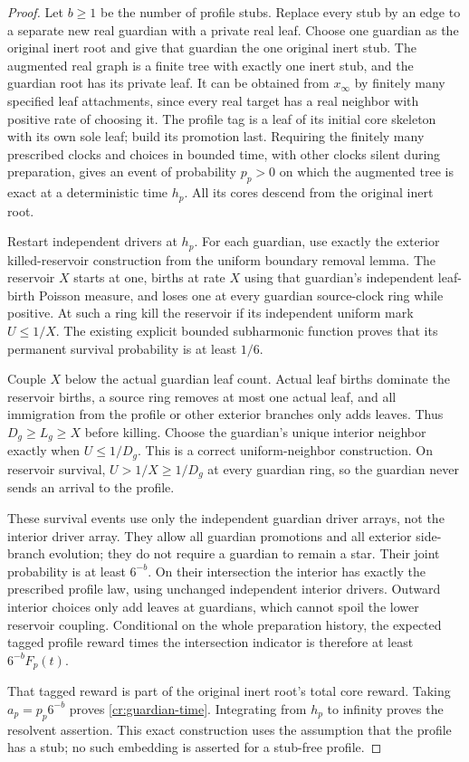 \begin{proof}
Let $b\ge1$ be the number of profile stubs.  Replace every stub by
an edge to a separate new real guardian with a private real leaf.
Choose one guardian as the original inert root and give that guardian
the one original inert stub.  The augmented real graph is a finite
tree with exactly one inert stub, and the guardian root has its
private leaf.  It can be obtained from $x_\infty$ by finitely many
specified leaf attachments, since every real target has a real
neighbor with positive rate of choosing it.  The profile tag is a
leaf of its initial core skeleton with its own sole leaf; build its
promotion last.  Requiring the finitely many prescribed clocks and
choices in bounded time, with other clocks silent during preparation,
gives an event of probability $p_p>0$ on which the augmented tree is
exact at a deterministic time $h_p$.  All its cores descend from the
original inert root.

Restart independent drivers at $h_p$.  For each guardian, use exactly
the exterior killed-reservoir construction from the uniform boundary
removal lemma.  The reservoir $X$ starts at one, births at rate $X$
using that guardian's independent leaf-birth Poisson measure, and
loses one at every guardian source-clock ring while positive.  At
such a ring kill the reservoir if its independent uniform mark
$U\le1/X$.  The existing explicit bounded subharmonic function proves
that its permanent survival probability is at least $1/6$.

Couple $X$ below the actual guardian leaf count.  Actual leaf births
dominate the reservoir births, a source ring removes at most one
actual leaf, and all immigration from the profile or other exterior
branches only adds leaves.  Thus $D_g\ge L_g\ge X$ before killing.
Choose the guardian's unique interior neighbor exactly when
$U\le1/D_g$.  This is a correct uniform-neighbor construction.  On
reservoir survival, $U>1/X\ge1/D_g$ at every guardian ring, so the
guardian never sends an arrival to the profile.

These survival events use only the independent guardian driver arrays,
not the interior driver array.  They allow all guardian promotions
and all exterior side-branch evolution; they do not require a guardian
to remain a star.  Their joint probability is at least $6^{-b}$.
On their intersection the interior has exactly the prescribed profile
law, using unchanged independent interior drivers.  Outward interior
choices only add leaves at guardians, which cannot spoil the lower
reservoir coupling.  Conditional on the whole preparation history,
the expected tagged profile reward times the intersection indicator
is therefore at least $6^{-b}F_p(t)$.

That tagged reward is part of the original inert root's total core
reward.  Taking $a_p=p_p6^{-b}$ proves
\eqref{cr:guardian-time}.  Integrating from $h_p$ to infinity proves
the resolvent assertion.  This exact construction uses the assumption
that the profile has a stub; no such embedding is asserted for a
stub-free profile.
\end{proof}

